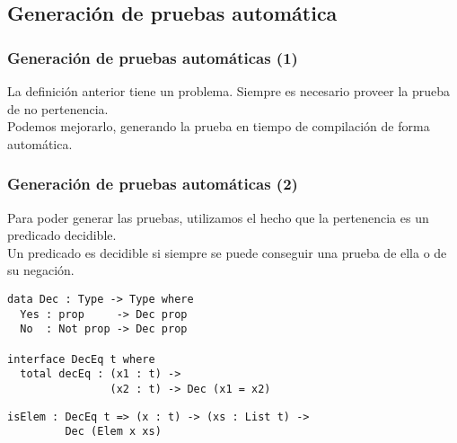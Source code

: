\documentclass{beamer}
\begin{document}
\subsection{Generación de pruebas automática}

\begin{frame}[fragile]
\frametitle{Generación de pruebas automáticas (1)}

La definición anterior tiene un problema. Siempre es necesario proveer la prueba de no pertenencia. \\

Podemos mejorarlo, generando la prueba en tiempo de compilación de forma automática.

\end{frame}

\begin{frame}[fragile]
\frametitle{Generación de pruebas automáticas (2)}

Para poder generar las pruebas, utilizamos el hecho que la pertenencia es un predicado decidible. \\

Un predicado es decidible si siempre se puede conseguir una prueba de ella o de su negación.

\pause

\begin{definition}
\begin{verbatim}
data Dec : Type -> Type where
  Yes : prop     -> Dec prop
  No  : Not prop -> Dec prop

interface DecEq t where
  total decEq : (x1 : t) -> 
                (x2 : t) -> Dec (x1 = x2)
\end{verbatim}
\end{definition}

\pause

\begin{definition}
\begin{verbatim}
isElem : DecEq t => (x : t) -> (xs : List t) -> 
         Dec (Elem x xs)
\end{verbatim}
\end{definition}

\end{frame}
\end{document}
